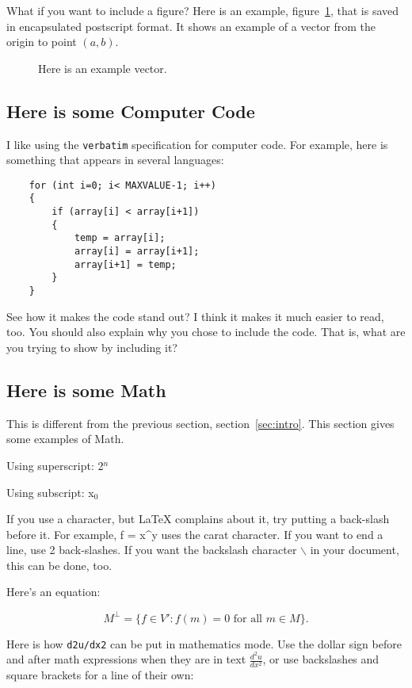 \documentclass[final]{ieee}
\begin{document}
What if you want to include a figure? 
Here is an example, figure~\ref{fig:phasor1}, that is saved in 
encapsulated postscript format. It shows an example of a vector
from the origin to point $(a,b)$.

\begin{figure}[!hbt]
  \centering
  \caption{Here is an example vector.}
  \label{fig:phasor1}
\end{figure}


\subsection{Here is some Computer Code}\label{sec:code}

I like using the \verb"verbatim" specification for computer code. 
For example, here is something that appears in several
languages:

\begin{verbatim}
    for (int i=0; i< MAXVALUE-1; i++)
    {
        if (array[i] < array[i+1]) 
        {
            temp = array[i];
            array[i] = array[i+1];
            array[i+1] = temp;
        }
    }
\end{verbatim}

See how it makes the code stand out? I think it makes it
much easier to read, too. You should also explain why you
chose to include the code. That is, what are you trying to 
show by including it?


\subsection{Here is some Math}\label{sec:math}
This is different from the previous section, section~\ref{sec:intro}.
This section gives some examples of Math.

Using superscript:  2$^{n}$

Using subscript: x$_{0}$

If you use a character, but LaTeX complains about it, try putting a 
back-slash before it. For example, 
f = x\^{}y  uses the carat character. 
If you want to end a line, use 2 back-slashes.
If you want the backslash character $\backslash$ in your document,
this can be done, too.

Here's an equation:

\[ M^\bot = \{ f \in V' : f(m) = 0 \mbox{ for all } m \in M \}.\]

Here is how \verb"d2u/dx2" can be put in mathematics mode.
Use the dollar sign before and after math expressions when they
are in text $\frac{d^2 u}{dx^2}$, or use backslashes and square brackets
for a line of their own:
\end{document}
